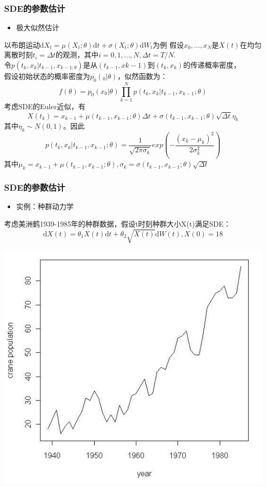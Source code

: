 \begin{frame}

\frametitle{SDE的参数估计}
\begin{itemize}
\item 极大似然估计
\end{itemize}
以布朗运动$\mathrm{d}X_t = \mu(X_t;\theta)\mathrm{d}t + \sigma(X_t;\theta)\mathrm{d}W_t$为例
假设$x_0,...,x_N$是$X(t)$在均匀离散时刻$t_i = \Delta t$的观测，其中$i = 0,1,...,N, \Delta t = T/N.$\\
令$p(t_k,x_k|t_{k-1},x_{k-1;\theta})$是从$(t_{k-1},x{k-1})$到$(t_k,x_k)$的传递概率密度，\\
假设初始状态的概率密度为$p_0(_0|\theta)$，似然函数为：$$f(\theta) = p_0(x_0|\theta)\prod_{k=1}^Np(t_k,x_k|t_{k-1},x_{k-1};\theta)$$
考虑SDE的Euler近似，有$$X(t_k) = x_{k-1} + \mu (t_{k-1},x_{k-1};\theta)\Delta t + \sigma(t_{k-1},x_{k-1};\theta)\sqrt{\Delta t}\eta_k$$
其中$\eta_k \sim N(0,1)$。因此
$$p(t_k,x_k|t_{k-1},x_{k-1};\theta) = \frac{1}{\sqrt{2\pi\sigma_k}}exp(-\frac{(x_k-\mu_k)^2}{2\sigma_k^2})$$
其中$\mu_k = x_{k-1} + \mu(t_{k-1},x_{k-1};\theta), \sigma_k = \sigma(t_{k-1},x_{k-1};\theta)\sqrt{\Delta t}$

\end{frame}

\begin{frame}

\frametitle{SDE的参数估计}
\begin{itemize}
\item 实例：种群动力学
\end{itemize}

考虑美洲鹤1939-1985年的种群数据，假设t时刻种群大小X(t)满足SDE：$$\mathrm{d}X(t) = \theta_1X(t)\mathrm{d}t + \theta_2\sqrt{X(t)}\mathrm{d}W(t), X(0) = 18$$

\begin{center}
\includegraphics[width = .6\textwidth]{images/goose.png}
\end{center}

\end{frame}
